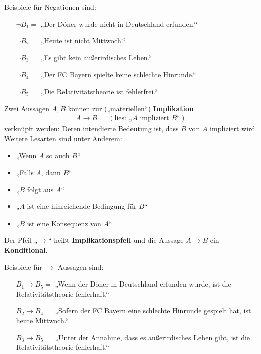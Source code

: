 \begin{bsp}    
    Beispiele für Negationen sind:
    \begin{itemize}[labelindent=1.5em, leftmargin=!, labelwidth=]
        \item[$\neg B_1 =$] „Der Döner wurde nicht in Deutschland erfunden.“
        \item[$\neg B_2 =$] „Heute ist nicht Mittwoch.“
        \item[$\neg B_3 =$] „Es gibt kein außerirdisches Leben.“
        \item[$\neg B_4 =$] „Der FC Bayern spielte keine schlechte Hinrunde.“
        \item[$\neg B_5 =$] „Die Relativitätstheorie ist fehlerfrei.“
    \end{itemize}
\end{bsp}


\begin{defin}[Implikationspfeil] 
    Zwei Aussagen $A,B$ können zur („materiellen“) \textbf{Implikation}
    \begin{align*}
        A\to B   && (\text{lies: „$A$ impliziert $B$“})
    \end{align*}
    verknüpft werden: Deren intendierte Bedeutung ist, dass $B$ von $A$ impliziert wird. Weitere Lesarten sind unter Anderem:
    \begin{itemize}
        \item „Wenn $A$ so auch $B$“
        \item „Falls $A$, dann $B$“
        \item „$B$ folgt aus $A$“
        \item „$A$ ist eine hinreichende Bedingung für $B$“
        \item „$B$ ist eine Konsequenz von $A$“
    \end{itemize}
    Der Pfeil „$\to$“ heißt \textbf{Implikationspfeil} und die Aussage $A\to B$ ein \textbf{Konditional}.
\end{defin}


\begin{bsp}
    Beispiele für $\to$-Aussagen sind:
    \begin{itemize}[labelindent=1.5em, leftmargin=!, labelwidth=]
        \item[$B_1\to B_5=$] „Wenn der Döner in Deutschland erfunden wurde, ist die Relativitätstheorie fehlerhaft.“
        \item[$B_2\to B_4=$] „Sofern der FC Bayern eine schlechte Hinrunde gespielt hat, ist heute Mittwoch.“
        \item[$B_3\to B_5=$] „Unter der Annahme, dass es außerirdisches Leben gibt, ist die Relativitätstheorie fehlerhaft.“
    \end{itemize}
\end{bsp}



